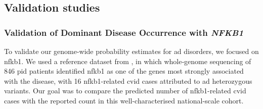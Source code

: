 %
%
%

\subsection{Validation studies}
\subsubsection{Validation of Dominant Disease Occurrence with \textit{NFKB1}}

To validate our genome-wide probability estimates for \ac{ad} disorders, we focused on \ac{nfkb1}. We used a reference dataset from \citet{tuijnenburgNFKB12018}, in which whole‐genome sequencing of 846 \ac{pid} patients identified \ac{nfkb1} as one of the genes most strongly associated with the disease, with 16 \ac{nfkb1}-related \ac{cvid} cases attributed to \ac{ad} heterozygous variants. Our goal was to compare the predicted number of \ac{nfkb1}-related \ac{cvid} cases with the reported count in this well-characterised national-scale cohort.

